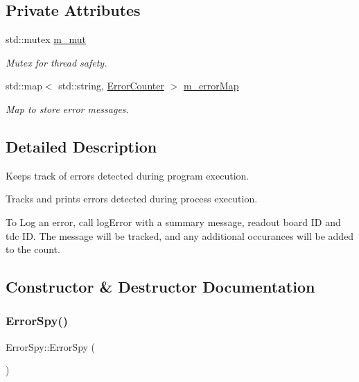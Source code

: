 \subsection*{Private Attributes}
\begin{DoxyCompactItemize}
\item 
std\+::mutex \hyperlink{class_error_spy_ae7d03be7562c1eb3ed4de48e33d89070}{m\+\_\+mut}
\begin{DoxyCompactList}\small\item\em Mutex for thread safety. \end{DoxyCompactList}\item 
std\+::map$<$ std\+::string, \hyperlink{class_error_counter}{Error\+Counter} $>$ \hyperlink{class_error_spy_a4a6e0b0cb04a7382ae0d92c54c60588e}{m\+\_\+error\+Map}
\begin{DoxyCompactList}\small\item\em Map to store error messages. \end{DoxyCompactList}\end{DoxyCompactItemize}


\subsection{Detailed Description}
Keeps track of errors detected during program execution. 

Tracks and prints errors detected during process execution.

To Log an error, call log\+Error with a summary message, readout board ID and tdc ID. The message will be tracked, and any additional occurances will be added to the count. 

\subsection{Constructor \& Destructor Documentation}
\mbox{\label{class_error_spy_a8d07ccabb00ac3925d94d77e7092bc99}} 
\subsubsection{\texorpdfstring{Error\+Spy()}{ErrorSpy()}\hspace{0.1cm}{\footnotesize\ttfamily [1/3]}}
{\footnotesize\ttfamily Error\+Spy\+::\+Error\+Spy (\begin{DoxyParamCaption}{ }\end{DoxyParamCaption})}



